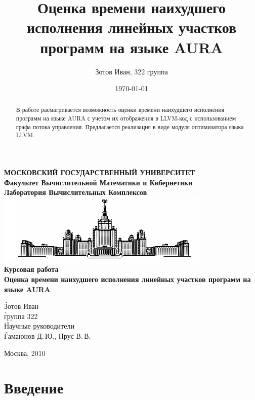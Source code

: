 \documentclass[12pt,a4paper]{article}
\title{Оценка времени наихудшего исполнения линейных участков программ на языке AURA}
\author{Зотов Иван, 322 группа}
\date{\today}
\begin{document}
\pagestyle{plain}


\begin{titlepage}
\begin{center}

{\bf МОСКОВСКИЙ ГОСУДАРСТВЕННЫЙ УНИВЕРСИТЕТ\\
  Факультет Вычислительной Математики и Кибернетики\\
  Лаборатория Вычислительных Комплексов\\[8mm]
 \includegraphics{resource/gzlogo.png}\\[8mm]
  Курсовая работа\\[24mm]
  Оценка времени наихудшего исполнения линейных участков программ на языке AURA\\
}
\vspace{10mm}
\begin{singlespace}
\begin{tabbing}
	\` Зотов Иван\\
	\` группа 322\\
	\` Научные руководители\\
	\` Гамаюнов Д.\,Ю., Прус В.\,В.
\end{tabbing}
\end{singlespace}
\vspace{5cm}
Москва, 2010
\end{center}
\end{titlepage}

\newpage
\begin{abstract}

В работе расматривается возможность оценки времени наихудшего исполнения программ на языке AURA  с учетом их отображения в LLVM-код с использованием графа потока управления. Предлагается реализация в виде модуля оптимизатора языка LLVM.

\end{abstract}
 
\newpage
\tableofcontents

\newpage

\section{Введение}
\end{document}
